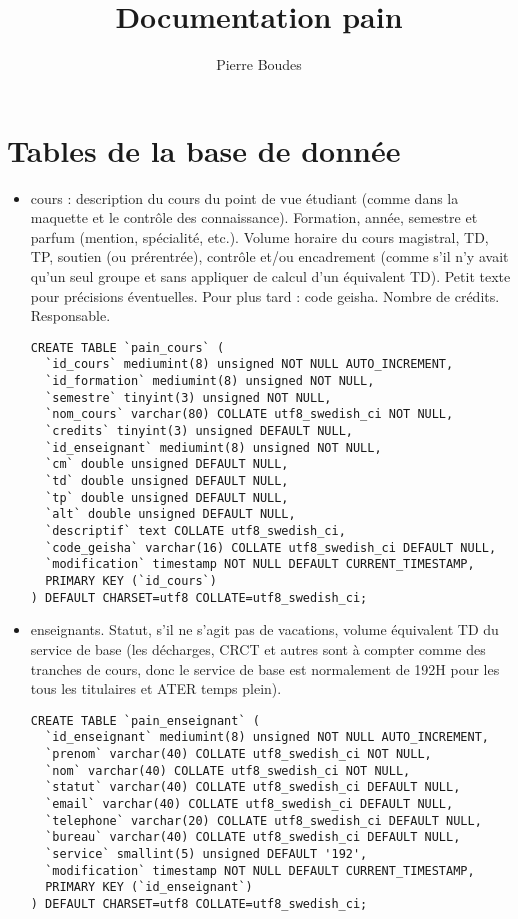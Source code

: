 \documentclass{article}
\begin{document}
\title{Documentation pain}
\author{Pierre Boudes}

\section{Tables de la base de donnée}

\begin{itemize}
\item cours : description du cours du point de vue étudiant (comme dans la maquette et le contrôle des connaissance). Formation, année, semestre et parfum (mention, spécialité, etc.). Volume horaire du cours magistral, TD, TP, soutien (ou prérentrée), contrôle et/ou encadrement  (comme s'il n'y avait qu'un seul groupe et sans appliquer de calcul d'un équivalent TD). Petit texte pour précisions éventuelles. Pour plus tard : code geisha. Nombre de crédits. Responsable.
\begin{verbatim}
CREATE TABLE `pain_cours` (
  `id_cours` mediumint(8) unsigned NOT NULL AUTO_INCREMENT,
  `id_formation` mediumint(8) unsigned NOT NULL,
  `semestre` tinyint(3) unsigned NOT NULL,
  `nom_cours` varchar(80) COLLATE utf8_swedish_ci NOT NULL,
  `credits` tinyint(3) unsigned DEFAULT NULL,
  `id_enseignant` mediumint(8) unsigned NOT NULL,
  `cm` double unsigned DEFAULT NULL,
  `td` double unsigned DEFAULT NULL,
  `tp` double unsigned DEFAULT NULL,
  `alt` double unsigned DEFAULT NULL,
  `descriptif` text COLLATE utf8_swedish_ci,
  `code_geisha` varchar(16) COLLATE utf8_swedish_ci DEFAULT NULL,
  `modification` timestamp NOT NULL DEFAULT CURRENT_TIMESTAMP,
  PRIMARY KEY (`id_cours`)
) DEFAULT CHARSET=utf8 COLLATE=utf8_swedish_ci;
\end{verbatim}
\item enseignants. Statut, s'il ne s'agit pas de vacations, volume équivalent TD du service de base (les décharges, CRCT et autres sont à compter comme des tranches de cours, donc le service de base est normalement de 192H pour les tous les titulaires et ATER temps plein). 
\begin{verbatim}
CREATE TABLE `pain_enseignant` (
  `id_enseignant` mediumint(8) unsigned NOT NULL AUTO_INCREMENT,
  `prenom` varchar(40) COLLATE utf8_swedish_ci NOT NULL,
  `nom` varchar(40) COLLATE utf8_swedish_ci NOT NULL,
  `statut` varchar(40) COLLATE utf8_swedish_ci DEFAULT NULL,
  `email` varchar(40) COLLATE utf8_swedish_ci DEFAULT NULL,
  `telephone` varchar(20) COLLATE utf8_swedish_ci DEFAULT NULL,
  `bureau` varchar(40) COLLATE utf8_swedish_ci DEFAULT NULL,
  `service` smallint(5) unsigned DEFAULT '192',
  `modification` timestamp NOT NULL DEFAULT CURRENT_TIMESTAMP,
  PRIMARY KEY (`id_enseignant`)
) DEFAULT CHARSET=utf8 COLLATE=utf8_swedish_ci;
\end{verbatim}



\end{itemize}
\end{document}
